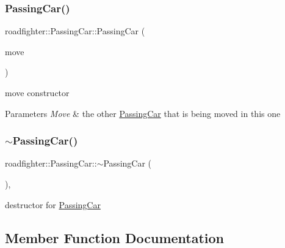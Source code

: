 \subsubsection{\texorpdfstring{Passing\+Car()}{PassingCar()}\hspace{0.1cm}{\footnotesize\ttfamily [3/3]}}
{\footnotesize\ttfamily roadfighter\+::\+Passing\+Car\+::\+Passing\+Car (\begin{DoxyParamCaption}\item[{\hyperlink{classroadfighter_1_1PassingCar}{Passing\+Car} \&\&}]{move }\end{DoxyParamCaption})\hspace{0.3cm}{\ttfamily [default]}}

move constructor 
\begin{DoxyParams}{Parameters}
{\em Move} & the other \hyperlink{classroadfighter_1_1PassingCar}{Passing\+Car} that is being moved in this one \\
\hline
\end{DoxyParams}
\mbox{\label{classroadfighter_1_1PassingCar_ab590a845658cdb5aae74c0a922548aa8}} 
\subsubsection{\texorpdfstring{$\sim$\+Passing\+Car()}{~PassingCar()}}
{\footnotesize\ttfamily roadfighter\+::\+Passing\+Car\+::$\sim$\+Passing\+Car (\begin{DoxyParamCaption}{ }\end{DoxyParamCaption})\hspace{0.3cm}{\ttfamily [override]}, {\ttfamily [default]}}

destructor for \hyperlink{classroadfighter_1_1PassingCar}{Passing\+Car} 

\subsection{Member Function Documentation}
\mbox{\label{classroadfighter_1_1PassingCar_a43d55e28efe840d81c1b87216920eb69}} 
